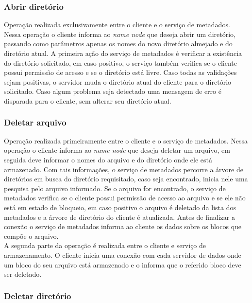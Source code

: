 \subsubsection{Abrir diretório}

Operação realizada exclusivamente entre o cliente e o serviço de metadados. Nessa operação o cliente informa ao \textit{name node} que deseja abrir um diretório, passando como parâmetros apenas os nomes do novo diretório almejado e do diretório atual. A primeira ação do serviço de metadados é verificar a existência do diretório solicitado, em caso positivo, o serviço também verifica se o cliente possui permissão de acesso e se o diretório está livre. Caso todas as validações sejam positivas, o servidor muda o diretório atual do cliente para o diretório solicitado. Caso algum problema seja detectado uma mensagem de erro é disparada para o cliente, sem alterar seu diretório atual.
\\

\subsubsection{Deletar arquivo}

Operação realizada primeiramente entre o cliente e o serviço de metadados. Nessa operação o cliente informa ao \textit{name node} que deseja deletar um arquivo, em seguida deve informar o nomes do arquivo e do diretório onde ele está armazenado. Com tais informações, o serviço de metadados percorre a árvore de diretórios em busca do diretório requisitado, caso seja encontrado, inicia nele uma pesquisa pelo arquivo informado. Se o arquivo for encontrado, o serviço de metadados verifica se o cliente possui permissão de acesso ao arquivo e se ele não está em estado de bloqueio, em caso positivo o arquivo é deletado da lista dos metadados e a árvore de diretório do cliente é atualizada. Antes de finalizar a conexão o serviço de metadados informa ao cliente os dados sobre os blocos que compõe o arquivo.
\\

A segunda parte da operação é realizada entre o cliente e serviço de armazenamento. O cliente inicia uma conexão com cada servidor de dados onde um bloco do seu arquivo está armazenado e o informa que o referido bloco deve ser deletado.
\\

\subsubsection{Deletar diretório}

